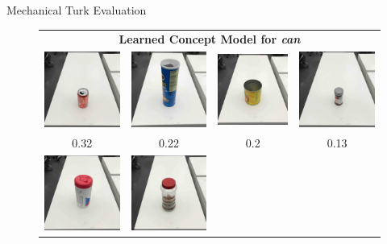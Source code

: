 \documentclass[final]{beamer}
\newcommand{\setblocksize}{\Large \centering}
\begin{document}
\begin{frame}{}
\begin{columns}[t]
\begin{column}{0.24\linewidth}
\begin{block}{\setblocksize Mechanical Turk Evaluation}
{\begin{figure}
\centering
\begin{tabular}[t!]{cccc}
  \multicolumn{4}{c}{\bf Learned Concept Model for \emph{can}} \\
  \includegraphics[width=0.22\linewidth]{figures/oidx_26.jpg} &
  \includegraphics[width=0.22\linewidth]{figures/oidx_13.jpg} &
  \includegraphics[width=0.22\linewidth]{figures/oidx_11.jpg} &
  \includegraphics[width=0.22\linewidth]{figures/oidx_25.jpg} \\
  0.32 & 0.22 & 0.2 & 0.13 \\
  \includegraphics[width=0.22\linewidth]{figures/oidx_12.jpg} &
  \includegraphics[width=0.22\linewidth]{figures/oidx_22.jpg} &

\end{tabular}
\end{figure}}
\end{block}
\end{column}
\end{columns}
\end{frame}
\end{document}
